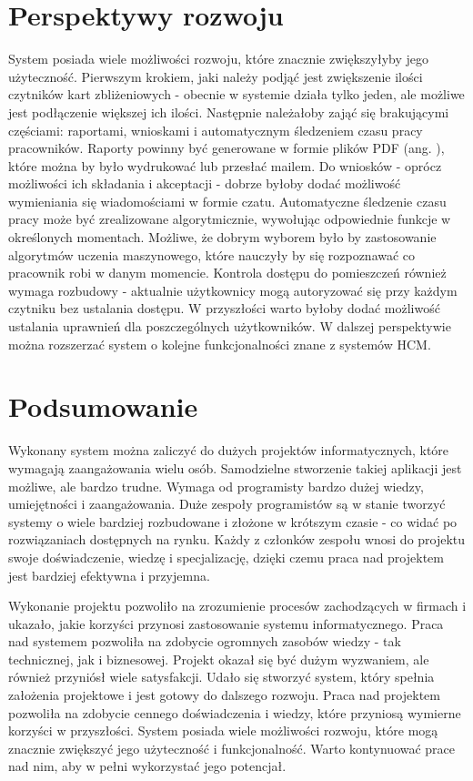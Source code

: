\section{Perspektywy rozwoju}

System posiada wiele możliwości rozwoju, które znacznie zwiększyłyby jego użyteczność. Pierwszym krokiem, jaki należy podjąć jest zwiększenie ilości czytników kart zbliżeniowych - obecnie w systemie działa tylko jeden, ale możliwe jest podłączenie większej ich ilości. Następnie należałoby zająć się brakującymi częściami: raportami, wnioskami i automatycznym śledzeniem czasu pracy pracowników. Raporty powinny być generowane w formie plików PDF (ang. ), które można by było wydrukować lub przesłać mailem. Do wniosków - oprócz możliwości ich składania i akceptacji - dobrze byłoby dodać możliwość wymieniania się wiadomościami w formie czatu. Automatyczne śledzenie czasu pracy może być zrealizowane algorytmicznie, wywołując odpowiednie funkcje w określonych momentach. Możliwe, że dobrym wyborem było by zastosowanie algorytmów uczenia maszynowego, które nauczyły by się rozpoznawać co pracownik robi w danym momencie. Kontrola dostępu do pomieszczeń również wymaga rozbudowy - aktualnie użytkownicy mogą autoryzować się przy każdym czytniku bez ustalania dostępu. W przyszłości warto byłoby dodać możliwość ustalania uprawnień dla poszczególnych użytkowników. W dalszej perspektywie można rozszerzać system o kolejne funkcjonalności znane z systemów HCM.

\section{Podsumowanie}

Wykonany system można zaliczyć do dużych projektów informatycznych, które wymagają zaangażowania wielu osób. Samodzielne stworzenie takiej aplikacji jest możliwe, ale bardzo trudne. Wymaga od programisty bardzo dużej wiedzy, umiejętności i zaangażowania. Duże zespoły programistów są w stanie tworzyć systemy o wiele bardziej rozbudowane i złożone w krótszym czasie - co widać po rozwiązaniach dostępnych na rynku. Każdy z członków zespołu wnosi do projektu swoje doświadczenie, wiedzę i specjalizację, dzięki czemu praca nad projektem jest bardziej efektywna i przyjemna.

Wykonanie projektu pozwoliło na zrozumienie procesów zachodzących w firmach i ukazało, jakie korzyści przynosi zastosowanie systemu informatycznego. Praca nad systemem pozwoliła na zdobycie ogromnych zasobów wiedzy - tak technicznej, jak i biznesowej. Projekt okazał się być dużym wyzwaniem, ale również przyniósł wiele satysfakcji. Udało się stworzyć system, który spełnia założenia projektowe i jest gotowy do dalszego rozwoju. Praca nad projektem pozwoliła na zdobycie cennego doświadczenia i wiedzy, które przyniosą wymierne korzyści w przyszłości. System posiada wiele możliwości rozwoju, które mogą znacznie zwiększyć jego użyteczność i funkcjonalność. Warto kontynuować prace nad nim, aby w pełni wykorzystać jego potencjał.